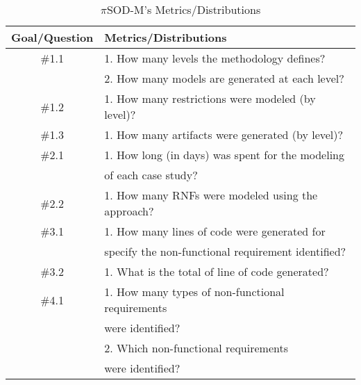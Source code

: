 \begin{table}
\centering
\caption{$\pi$SOD-M's Metrics/Distributions}
\label{tab8:metrics}

\begin{tabular}{|c|l|}

\hline 
\hline \textbf{Goal/Question} & \textbf{Metrics/Distributions} \\

\hline \#1.1 & 1. How many levels the methodology defines?  \\
& 2. How many models are generated at each level?\\
\hline \#1.2 & 1. How many restrictions were modeled (by level)?  \\
\hline \#1.3 & 1. How many artifacts were generated (by level)?  \\
\hline \#2.1 & 1. How long (in days) was spent for the modeling   \\
&  of each case study? \\
\hline \#2.2 & 1. How many RNFs were modeled using the approach?  \\
\hline \#3.1 & 1. How many lines of code were generated for \\
& specify the non-functional requirement identified? \\

\hline \#3.2 & 1. What is the total of line of code generated? \\

\hline \#4.1 &  1. How many types of non-functional requirements \\
& were identified?\\

 &  2. Which non-functional requirements \\
& were identified?\\

\hline
\hline

\hline


\end{tabular}

\end{table}

% 
% 
% 
% 
% 
% 
%  

